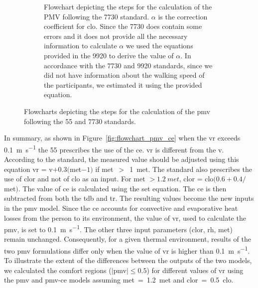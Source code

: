 \begin{figure}[!htb]
\begin{subfigure}[b]{\textwidth}
        \caption{Flowchart depicting the steps for the calculation of the PMV following the \gls{7730} standard.
            $\alpha$ is the correction coefficient for \acs{clo}.
            Since the \gls{7730} does contain some errors and it does not provide all the necessary information to calculate $\alpha$ we used the equations provided in the \gls{9920} to derive the value of $\alpha$.
        In accordance with the \gls{7730} and \gls{9920} standards, since we did not have information about the walking speed of the participants, we estimated it using the provided equation.
        }
        \label{fig:flowchart_pmv_iso}
    \end{subfigure}
    \caption{Flowcharts depicting the steps for the calculation of the \ac{pmv} following the \gls{55} and \gls{7730} standards.}
    \label{fig:flowchart_pmv_calculation}
\end{figure}
In summary, as shown in Figure~\ref{fig:flowchart_pmv_ce} when the \ac{vr} exceeds \qty{0.1}{\m\per\s} the \gls{55} prescribes the use of the \ac{ce}.
\ac{vr} is different from the \ac{v}.
According to the standard, the measured value should be adjusted using this equation \ac{vr} = \ac{v}$+ 0.3 ($\acs{met}$-1)$ if \ac{met}~$>$~\qty{1}{met}.
The standard also prescribes the use of \ac{clor} and not of \ac{clo} as an input.
For \ac{met} $> \qty{1.2}{met}$, \acs{clor} = \acs{clo}$(0.6 + 0.4/$\acs{met}$)$.
The value of \ac{ce} is calculated using the \ac{set} equation.
The \ac{ce} is then subtracted from both the \ac{tdb} and \ac{tr}.
The resulting values become the new inputs in the \ac{pmv} model.
Since the \ac{ce} accounts for convective and evaporative heat losses from the person to its environment, the value of \ac{vr}, used to calculate the \ac{pmv}, is set to \qty{0.1}{\m\per\s}.
The other three input parameters (\ac{clor}, \ac{rh}, \ac{met}) remain unchanged.
Consequently, for a given thermal environment, results of the two \ac{pmv} formulations differ only when the value of \ac{vr} is higher than \qty{0.1}{\m\per\s}.
To illustrate the extent of the differences between the outputs of the two models, we calculated the comfort regions ($\mid$\ac{pmv}$\mid \leq 0.5$) for different values of \ac{vr} using the \ac{pmv} and \ac{pmv-ce} models assuming \ac{met}~=~\qty{1.2}{met} and \ac{clor}~=~\qty{0.5}{clo}.
